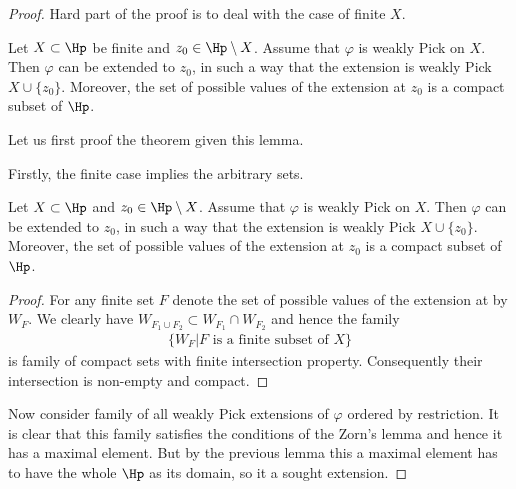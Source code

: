 \begin{proof}
	Hard part of the proof is to deal with the case of finite $X$.
	\begin{lem}\label{finite_pick_extension_lemma}
		Let $X \subset \Hp$ be finite and $z_{0} \in \Hp \setminus X$. Assume that $\varphi$ is weakly Pick on $X$. Then $\varphi$ can be extended to $z_{0}$, in such a way that the extension is weakly Pick $X \cup \{z_{0}\}$. Moreover, the set of possible values of the extension at $z_{0}$ is a compact subset of $\Hp$.
	\end{lem}

	Let us first proof the theorem given this lemma.

	Firstly, the finite case implies the arbitrary sets.
	\begin{lem}\label{pick_extension_lemma}
		Let $X \subset \Hp$ and $z_{0} \in \Hp \setminus X$. Assume that $\varphi$ is weakly Pick on $X$. Then $\varphi$ can be extended to $z_{0}$, in such a way that the extension is weakly Pick $X \cup \{z_{0}\}$. Moreover, the set of possible values of the extension at $z_{0}$ is a compact subset of $\Hp$.
	\end{lem}
	\begin{proof}
		For any finite set $F$ denote the set of possible values of the extension at by $W_{F}$. We clearly have $W_{F_{1} \cup F_{2}} \subset W_{F_{1}} \cap W_{F_{2}}$ and hence the family
		\begin{align*}
			\{ W_{F} | \text{$F$ is a finite subset of $X$}\}
		\end{align*}
		is family of compact sets with finite intersection property. Consequently their intersection is non-empty and compact.
	\end{proof}

	Now consider family of all weakly Pick extensions of $\varphi$ ordered by restriction. It is clear that this family satisfies the conditions of the Zorn's lemma and hence it has a maximal element. But by the previous lemma this a maximal element has to have the whole $\Hp$ as its domain, so it a sought extension.
\end{proof}


